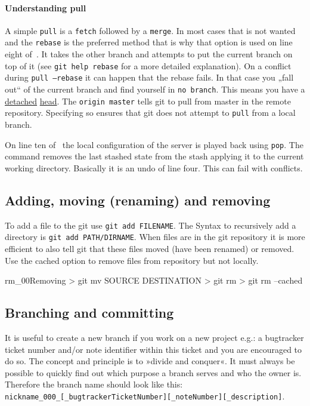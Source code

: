 \paragraph{Understanding pull}
A simple \texttt{pull} is a \texttt{fetch} followed by a \texttt{merge}. In most cases that is not wanted and the \texttt{rebase} is the preferred method that is why that option is used on line eight of~. It takes the other branch and attempts to put the current branch on top of it (see \texttt{git help rebase} for a more detailed explanation). On a conflict during \texttt{pull --rebase} it can happen that the rebase fails. In that case you „fall out“ of the current branch and find yourself in \texttt{no branch}. This means you have a \href{http://www.kernel.org/pub/software/scm/git/docs/git-checkout.html#_detached_head}{detached} \href{http://sitaramc.github.com/concepts/detached-head.html}{head}. The \texttt{origin master} tells git to pull from master in the remote repository. Specifying so ensures that git does not attempt to \texttt{pull} from a local branch.

On line ten of~ the local configuration of the server is played back using \texttt{pop}. The command removes the last stashed state from the stash applying it to the current working directory. Basically it is an undo of line four. This can fail with conflicts.
\subsection{Adding, moving (renaming) and removing}
To add a file to the git use \texttt{git add FILENAME}. The Syntax to recursively add a directory is \texttt{git add PATH/DIRNAME}. When files are in the git repository it is more efficient to also tell git that these files moved (have been renamed) or removed. Use the cached option to remove files from repository but not locally.
\begin{codelisting}{rm_00}{Removing}
> git mv SOURCE DESTINATION
> git rm
> git rm --cached
\end{codelisting}
\subsection{Branching and committing}\label{sec:branching_and_comitting}
It is useful to create a new branch if you work on a new project e.g.: a bugtracker ticket number and/or note identifier within this ticket and you are encouraged to do so. The concept and principle is to »divide and conquer«. It must always be possible to quickly find out which purpose a branch serves and who the owner is. Therefore the branch name should look like this:\\ \texttt{nickname\_000\_{[\_bugtrackerTicketNumber]}{[\_noteNumber]}{[\_description]}}.


